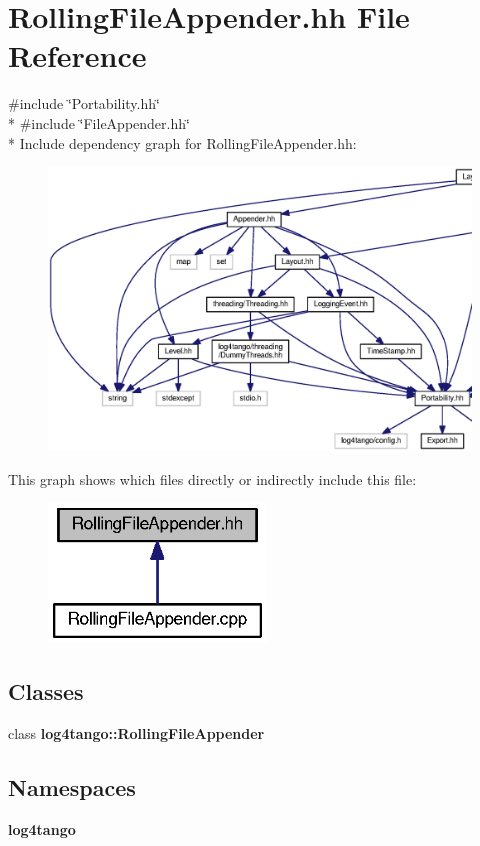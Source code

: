 \section{Rolling\-File\-Appender.\-hh File Reference}
\label{RollingFileAppender_8hh}
{\ttfamily \#include \char`\"{}Portability.\-hh\char`\"{}}\\*
{\ttfamily \#include \char`\"{}File\-Appender.\-hh\char`\"{}}\\*
Include dependency graph for Rolling\-File\-Appender.\-hh\-:
\nopagebreak
\begin{figure}[H]
\begin{center}
\leavevmode
\includegraphics[width=350pt]{d3/d43/RollingFileAppender_8hh__incl}
\end{center}
\end{figure}
This graph shows which files directly or indirectly include this file\-:
\nopagebreak
\begin{figure}[H]
\begin{center}
\leavevmode
\includegraphics[width=164pt]{da/d71/RollingFileAppender_8hh__dep__incl}
\end{center}
\end{figure}
\subsection*{Classes}
\begin{DoxyCompactItemize}
\item 
class {\bf log4tango\-::\-Rolling\-File\-Appender}
\end{DoxyCompactItemize}
\subsection*{Namespaces}
\begin{DoxyCompactItemize}
\item 
{\bf log4tango}
\end{DoxyCompactItemize}
